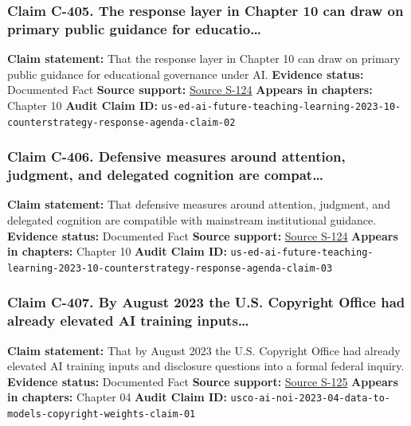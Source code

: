 \documentclass[
  american,
  11pt,
  letterpaper,
]{article}
\begin{document}
\subsubsection{Claim C-405. The response layer in Chapter 10 can draw on
primary public guidance for
educatio\ldots{}}\label{claim-c-405-the-response-layer-in-chapter-10-can-draw-on-primary-public-guidance-for-educatio}

\textbf{Claim statement:} That the response layer in Chapter 10 can draw
on primary public guidance for educational governance under AI.
\textbf{Evidence status:} Documented Fact \textbf{Source support:}
\hyperref[source-s-124-artificial-intelligence-and-the-future-of-teaching-and-learning-insights-and-recommendations]{Source
S-124} \textbf{Appears in chapters:} Chapter 10 \textbf{Audit Claim ID:}
\texttt{us-ed-ai-future-teaching-learning-2023-10-counterstrategy-response-agenda-claim-02}

\subsubsection{Claim C-406. Defensive measures around attention,
judgment, and delegated cognition are
compat\ldots{}}\label{claim-c-406-defensive-measures-around-attention-judgment-and-delegated-cognition-are-compat}

\textbf{Claim statement:} That defensive measures around attention,
judgment, and delegated cognition are compatible with mainstream
institutional guidance. \textbf{Evidence status:} Documented Fact
\textbf{Source support:}
\hyperref[source-s-124-artificial-intelligence-and-the-future-of-teaching-and-learning-insights-and-recommendations]{Source
S-124} \textbf{Appears in chapters:} Chapter 10 \textbf{Audit Claim ID:}
\texttt{us-ed-ai-future-teaching-learning-2023-10-counterstrategy-response-agenda-claim-03}

\subsubsection{Claim C-407. By August 2023 the U.S. Copyright Office had
already elevated AI training
inputs\ldots{}}\label{claim-c-407-by-august-2023-the-u-s-copyright-office-had-already-elevated-ai-training-inputs}

\textbf{Claim statement:} That by August 2023 the U.S. Copyright Office
had already elevated AI training inputs and disclosure questions into a
formal federal inquiry. \textbf{Evidence status:} Documented Fact
\textbf{Source support:}
\hyperref[source-s-125-copyright-and-artificial-intelligence-notice-of-inquiry]{Source
S-125} \textbf{Appears in chapters:} Chapter 04 \textbf{Audit Claim ID:}
\texttt{usco-ai-noi-2023-04-data-to-models-copyright-weights-claim-01}
\end{document}
